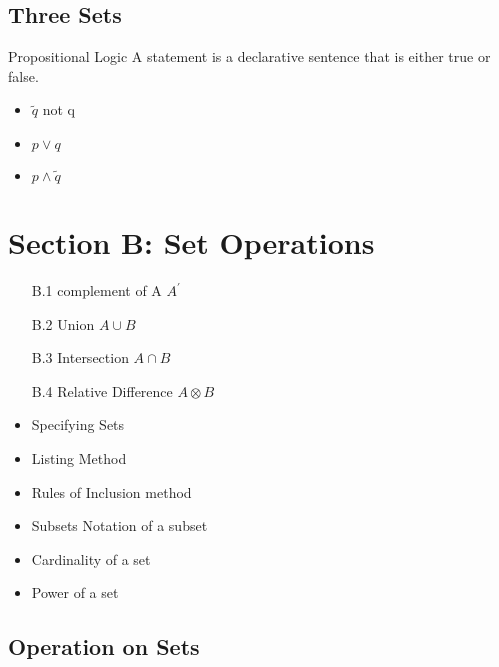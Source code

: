 
\subsection*{ Three Sets }






Propositional Logic A statement is a declarative sentence that
is either true or false.
\begin{itemize}
\item $\tilde q$ not q \item $p \vee q$ \item $p \wedge \tilde
q$
\end{itemize}



\newpage
\section*{Section B: Set Operations}
\begin{itemize}
\item[B.1] complement of A $A^{\prime}$
\item[B.2] Union $A \cup B$
\item[B.3] Intersection $A \cap B$
\item[B.4] Relative Difference $A \otimes B$

\end{itemize}
\newpage


\begin{itemize}
\item Specifying Sets
\item Listing Method
\item Rules of Inclusion method
\end{itemize}


\begin{itemize}
\item Subsets Notation of a subset
\item Cardinality of a set
\item Power of a set
\end{itemize}

\subsection*{Operation on Sets}


